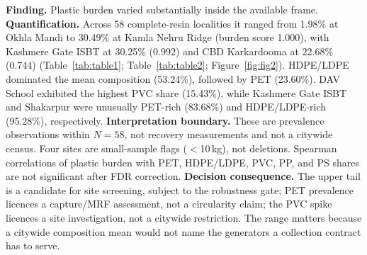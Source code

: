 \documentclass[12pt,a4paper]{article}
\begin{document}
\textbf{Finding.} Plastic burden varied substantially inside the available frame. \textbf{Quantification.} Across 58 complete-resin localities it ranged from 1.98\% at Okhla Mandi to 30.49\% at Kamla Nehru Ridge (burden score 1.000), with Kashmere Gate ISBT at 30.25\% (0.992) and CBD Karkardooma at 22.68\% (0.744) (Table~\ref{tab:table1}; Table~\ref{tab:table2}; Figure~\ref{fig:fig2}). HDPE/LDPE dominated the mean composition (53.24\%), followed by PET (23.60\%). DAV School exhibited the highest PVC share (15.43\%), while Kashmere Gate ISBT and Shakarpur were unusually PET-rich (83.68\%) and HDPE/LDPE-rich (95.28\%), respectively. \textbf{Interpretation boundary.} These are prevalence observations within $N=58$, not recovery measurements and not a citywide census. Four sites are small-sample flags ($<$10\,kg), not deletions. Spearman correlations of plastic burden with PET, HDPE/LDPE, PVC, PP, and PS shares are not significant after FDR correction. \textbf{Decision consequence.} The upper tail is a candidate for site screening, subject to the robustness gate; PET prevalence licences a capture/MRF assessment, not a circularity claim; the PVC spike licences a site investigation, not a citywide restriction. The range matters because a citywide composition mean would not name the generators a collection contract has to serve.
\end{document}
